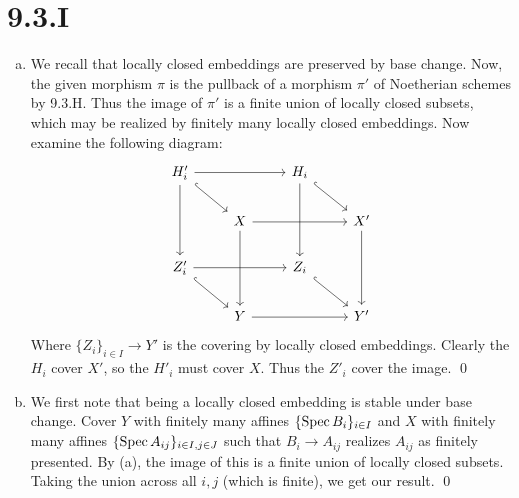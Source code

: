 \documentclass{article}
\begin{document}
\section{9.3.I}
\begin{enumerate}[a.]
    \item We recall that locally closed embeddings are preserved by base change. Now, the
          given morphism $\pi$ is the pullback of a morphism
          $\pi'$ of Noetherian schemes by 9.3.H. Thus the image of
          $\pi'$ is a finite union of locally closed subsets, which may be
          realized by finitely many locally closed embeddings. Now examine the following
          diagram: \[\begin{tikzcd}
                  {H_i'}                         &   & {H_i}
                  \\
                                                 & X &       & {X'}
                  \\{Z'_i} &   & {Z_i}        \\
                                                 & Y &       & {Y'}
                  \arrow[from=2-2, to=4-2]
                  \arrow[from=2-2, to=2-4]
                  \arrow[from=2-4, to=4-4]
                  \arrow[from=4-2, to=4-4]
                  \arrow[hook, from=3-3, to=4-4]
                  \arrow[hook, from=1-3, to=2-4]
                  \arrow[from=1-3, to=3-3]
                  \arrow[hook, from=1-1, to=2-2]
                  \arrow[hook, from=3-1, to=4-2]
                  \arrow[from=3-1, to=3-3]
                  \arrow[from=1-1, to=3-1]
                  \arrow[from=1-1, to=1-3]
              \end{tikzcd}\] Where $\{Z_i\}_{i\in I} \to Y'$ is the covering by
          locally closed embeddings. Clearly the $H_i$ cover
          $X'$, so the $H'_i$ must cover
          $X$. Thus the $Z'_i$ cover the image. \qed
    \item We first note that being a locally closed embedding is stable under base
          change. Cover $Y$ with finitely many affines
          $\{\operatorname{Spec} B_i\}_{i \in I}$ and $X$ with finitely many affines
          $\{\operatorname{Spec} A_{ij}\}_{i \in I,j \in J}$ such that $B_i \to A_{ij}$ realizes
          $A_{ij}$ as finitely presented. By (a), the image of this is a
          finite union of locally closed subsets. Taking the union across all
          $i, j$ (which is finite), we get our result. \qed
\end{enumerate}
\end{document}
